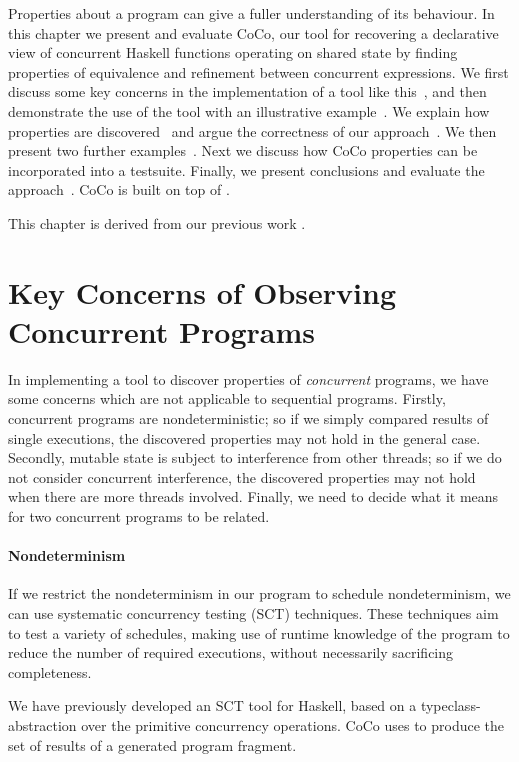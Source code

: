 Properties about a program can give a fuller understanding of its
behaviour.  In this chapter we present and evaluate CoCo, our tool for
recovering a declarative view of concurrent Haskell functions
operating on shared state by finding properties of equivalence and
refinement between concurrent expressions.  We first discuss some key
concerns in the implementation of a tool like
this~, and then demonstrate the use of the tool
with an illustrative example~.  We explain how
properties are discovered~ and argue the correctness of
our approach~.  We then present two further
examples~.  Next we discuss how CoCo properties can
be incorporated into a \dejafu{} testsuite.  Finally, we present
conclusions and evaluate the approach~.  CoCo
is built on top of \dejafu{}.

This chapter is derived from our previous work .

\section{Key Concerns of Observing Concurrent Programs}
\label{sec:coco-concerns}

In implementing a tool to discover properties of \emph{concurrent}
programs, we have some concerns which are not applicable to sequential
programs.  Firstly, concurrent programs are nondeterministic; so if we
simply compared results of single executions, the discovered
properties may not hold in the general case.  Secondly, mutable state
is subject to interference from other threads; so if we do not
consider concurrent interference, the discovered properties may not
hold when there are more threads involved.  Finally, we need to decide
what it means for two concurrent programs to be related.

\paragraph{Nondeterminism}
If we restrict the nondeterminism in our program to schedule
nondeterminism, we can use systematic concurrency testing
(SCT)\cite{coons2013,flanagan2005,musuvathi2007,musuvathi2008}
techniques.  These techniques aim to test a variety of schedules,
making use of runtime knowledge of the program to reduce the number of
required executions, without necessarily sacrificing completeness.

We have previously developed \dejafu{}\cite{walker2015} an SCT tool
for Haskell, based on a typeclass-abstraction over the primitive
concurrency operations.  CoCo uses \dejafu{} to produce the set of
results of a generated program fragment.

